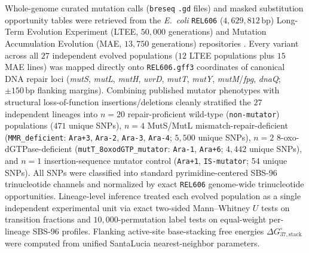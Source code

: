\documentclass[10pt,letterpaper]{article}
\theoremstyle{plain}
\theoremstyle{definition}
\begin{document}
Whole-genome curated mutation calls (\texttt{breseq} \texttt{.gd} files) and masked substitution opportunity tables were retrieved from the \emph{E.\ coli} \texttt{REL606} ($4{,}629{,}812\,\mathrm{bp}$) Long-Term Evolution Experiment (LTEE, $50{,}000$ generations) and Mutation Accumulation Evolution (MAE, $13{,}750$ generations) repositories \cite{tenaillon2016nature}. Every variant across all $27$ independent evolved populations ($12$ LTEE populations plus $15$ MAE lines) was mapped directly onto \texttt{REL606.gff3} coordinates of canonical DNA repair loci (\emph{mutS}, \emph{mutL}, \emph{mutH}, \emph{uvrD}, \emph{mutT}, \emph{mutY}, \emph{mutM}/\emph{fpg}, \emph{dnaQ}; $\pm 150\,\mathrm{bp}$ flanking margins). Combining published mutator phenotypes with structural loss-of-function insertions/deletions cleanly stratified the $27$ independent lineages into $n=20$ repair-proficient wild-type (\texttt{non-mutator}) populations ($471$ unique SNPs), $n=4$ MutS/MutL mismatch-repair-deficient (\texttt{MMR\_deficient}: \texttt{Ara+3}, \texttt{Ara-2}, \texttt{Ara-3}, \texttt{Ara-4}; $5{,}500$ unique SNPs), $n=2$ 8-oxo-dGTPase-deficient (\texttt{mutT\_8oxodGTP\_mutator}: \texttt{Ara-1}, \texttt{Ara+6}; $4{,}442$ unique SNPs), and $n=1$ insertion-sequence mutator control (\texttt{Ara+1}, \texttt{IS-mutator}; $54$ unique SNPs). All SNPs were classified into standard pyrimidine-centered SBS-96 trinucleotide channels and normalized by exact \texttt{REL606} genome-wide trinucleotide opportunities. Lineage-level inference treated each evolved population as a single independent experimental unit via exact two-sided Mann--Whitney $U$ tests on transition fractions and $10{,}000$-permutation label tests on equal-weight per-lineage SBS-96 profiles. Flanking active-site base-stacking free energies $\Delta G^\circ_{37,\mathrm{stack}}$ were computed from unified SantaLucia nearest-neighbor parameters.
\end{document}
